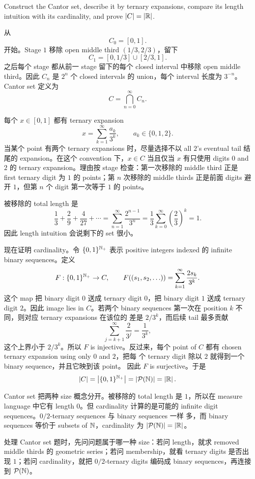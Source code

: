 \begin{exerciseblock}
Construct the Cantor set, describe it by ternary expansions, compare its length
intuition with its cardinality, and prove \(\left|C\right|=\left|\mathbb{R}\right|\).
\end{exerciseblock}

\begin{solution}
从
\[
  C_0=[0,1].
\]
开始。Stage \(1\) 移除 open middle third \((1/3,2/3)\)，留下
\[
  C_1=[0,1/3]\cup[2/3,1].
\]
之后每个 stage 都从前一 stage 留下的每个 closed interval 中移除 open
middle third。因此 \(C_n\) 是 \(2^n\) 个 closed intervals 的 union，每个
interval 长度为 \(3^{-n}\)。Cantor set 定义为
\[
  C=\bigcap_{n=0}^{\infty}C_n.
\]

每个 \(x\in[0,1]\) 都有 ternary expansion
\[
  x=\sum_{k=1}^{\infty}\frac{a_k}{3^k},
  \qquad a_k\in\{0,1,2\}.
\]
当某个 point 有两个 ternary expansions 时，尽量选择不以 all \(2\)'s
eventual tail 结尾的 expansion。在这个 convention 下，\(x\in C\) 当且仅当
\(x\) 有只使用 digits \(0\) and \(2\) 的 ternary expansion。理由按 stage
检查：第一次移除的 middle third 正是 first ternary digit 为 \(1\) 的
points；第 \(n\) 次移除的 middle thirds 正是前面 digits 避开 \(1\)，但第
\(n\) 个 digit 第一次等于 \(1\) 的 points。

被移除的 total length 是
\[
  \frac13+\frac{2}{9}+\frac{4}{27}+\cdots
  =
  \sum_{n=1}^{\infty}\frac{2^{n-1}}{3^n}
  =
  \frac13\sum_{k=0}^{\infty}\left(\frac23\right)^k
  =1.
\]
因此 length intuition 会说剩下的 set 很小。

现在证明 cardinality。令 \(\{0,1\}^{\mathbb{N}_+}\) 表示 positive integers indexed
的 infinite binary sequences。定义
\[
  F:\{0,1\}^{\mathbb{N}_+}\to C,\qquad
  F((s_1,s_2,\ldots))
  =
  \sum_{k=1}^{\infty}\frac{2s_k}{3^k}.
\]
这个 map 把 binary digit \(0\) 送成 ternary digit \(0\)，把 binary digit
\(1\) 送成 ternary digit \(2\)。因此 image lies in \(C\)。若两个 binary
sequences 第一次在 position \(k\) 不同，则对应 ternary expansions 在该位的
差是 \(2/3^k\)，而后续 tail 最多贡献
\[
  \sum_{j=k+1}^{\infty}\frac{2}{3^j}=\frac{1}{3^k},
\]
这个上界小于 \(2/3^k\)。所以 \(F\) is injective。反过来，每个
point of \(C\) 都有 chosen ternary expansion using only \(0\) and \(2\)，把每
个 ternary digit 除以 \(2\) 就得到一个 binary sequence，并且它映到该 point。
因此 \(F\) is surjective。于是
\[
  \left|C\right|=\left|\{0,1\}^{\mathbb{N}_+}\right|=\left|\mathcal{P}(\mathbb{N})\right|=\left|\mathbb{R}\right|.
\]
\end{solution}

\begin{explanation}
Cantor set 把两种 size 概念分开。被移除的 total length 是 \(1\)，所以在
measure language 中它有 length \(0\)。但 cardinality 计算的是可能的
infinite digit sequences。\(0/2\)-ternary sequences 与 binary sequences 一样
多，而 binary sequences 等价于 subsets of \(\mathbb{N}\)，cardinality 为
\(\left|\mathcal{P}(\mathbb{N})\right|=\left|\mathbb{R}\right|\)。

处理 Cantor set 题时，先问问题属于哪一种 size：若问 length，就求 removed
middle thirds 的 geometric series；若问 membership，就看 ternary digits
是否出现 \(1\)；若问 cardinality，就把 \(0/2\)-ternary digits 编码成 binary
sequences，再连接到 \(\mathcal{P}(\mathbb{N})\)。
\end{explanation}

